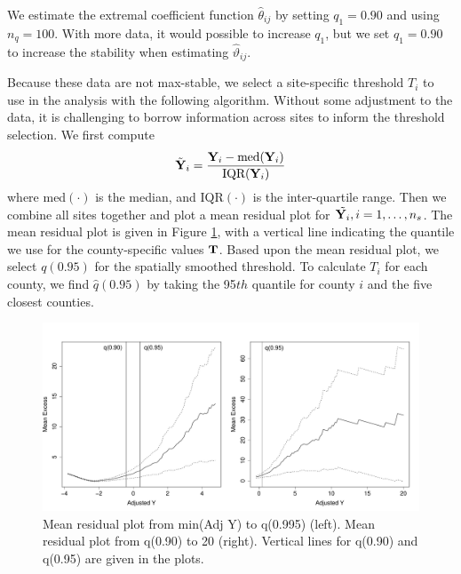 \documentclass[11pt]{article}
\begin{document}
We estimate the extremal coefficient function $\hat{\theta}_{ij}$ by setting $q_1 = 0.90$ and using $n_q = 100$.
With more data, it would possible to increase $q_1$, but we set $q_1 = 0.90$ to increase the stability when estimating $\hat{\vartheta}_{ij}$.

Because these data are not max-stable, we select a site-specific threshold $T_i$ to use in the analysis with the following algorithm.
Without some adjustment to the data, it is challenging to borrow information across sites to inform the threshold selection.
We first compute
\begin{align}
  \tilde{\mbox{\bf Y}}_i = \frac{\mbox{\bf Y}_i - \text{med}(\mbox{\bf Y}_i)}{\text{IQR}(\mbox{\bf Y}_i)}
\end{align}
where med$(\cdot)$ is the median, and IQR$(\cdot)$ is the inter-quartile range.
Then we combine all sites together and plot a mean residual plot for $\tilde{\mbox{\bf Y}_i}, i = 1, \ldots, n_s$.
The mean residual plot is given in Figure \ref{fig:mrlthresh}, with a vertical line indicating the quantile we use for the county-specific values $\mbox{\bf T}$.
Based upon the mean residual plot, we select $q(0.95)$ for the spatially smoothed threshold.
To calculate $T_i$ for each county, we find $\hat{q}(0.95)$ by taking the 95$th$ quantile for county $i$ and the five closest counties.

\begin{figure}[htbp]
  \centering
  \includegraphics[width = \linewidth]{plots/fire-mrl-plots.pdf}  %
  \caption{Mean residual plot from min(Adj Y) to q(0.995) (left). Mean residual plot from q(0.90) to 20 (right). Vertical lines for q(0.90) and q(0.95) are given in the plots.}
  \label{fig:mrlthresh}
\end{figure}
\end{document}
